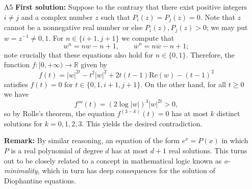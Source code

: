 \documentclass[amssymb,twocolumn,pra,10pt,aps]{revtex4-1}
\newcommand{\RR}{\mathbb{R}}
\begin{document}
\begin{itemize}
\item[A5]
\textbf{First solution:}
Suppose to the contrary that there exist positive integers $i \neq j$ and a complex number $z$ such that $P_i(z) = P_j(z) = 0$. Note that $z$ cannot be a nonnegative real number or else $P_i(z), P_j(z) > 0$; we may put $w = z^{-1} \neq 0,1$. For $n \in \{i+1,j+1\}$ we compute that
\[
w^n = n w - n + 1,
\qquad \overline{w}^n =  n \overline{w} - n + 1;
\]
note crucially that these equations also hold for $n \in \{0,1\}$.
Therefore, the function $f: [0, +\infty) \to \RR$ given by
\[
f(t) = \left| w \right|^{2t} - t^2 \left| w \right|^2 + 2t(t-1)\mathrm{Re}(w) - (t-1)^2
\]
satisfies $f(t) = 0$ for $t \in \{0,1,i+1,j+1\}$. On the other hand, for all $t \geq 0$ we have
\[
f'''(t) = (2 \log \left| w \right|)^3 \left| w \right|^{2t} > 0,
\]
so by Rolle's theorem, the equation $f^{(3-k)}(t) = 0$ has at most $k$ distinct solutions for $k=0,1,2,3$. This yields the desired contradiction.

\noindent
\textbf{Remark:}
By similar reasoning, an equation of the form $e^{x} = P(x)$ in which $P$ is a real polynomial of degree $d$ has at most $d+1$ real solutions. This turns out to be closely related to a concept in mathematical logic known as \emph{o-minimality}, which in turn has deep consequences for the solution of Diophantine equations.


\end{itemize}
\end{document}
